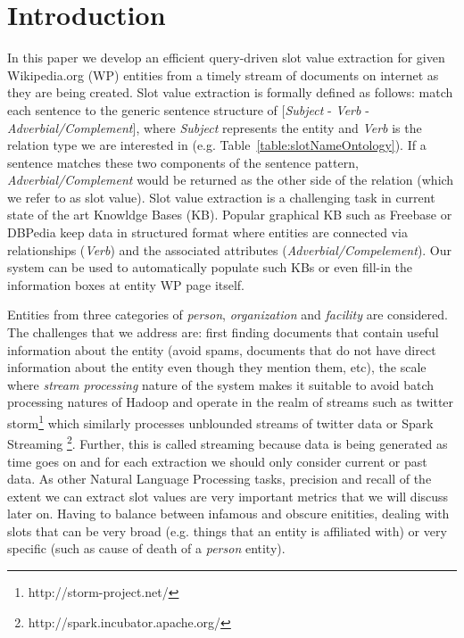 
\section{Introduction}


In this paper we develop an efficient query-driven slot value extraction for given Wikipedia.org (WP) entities from a timely stream of documents on internet as they are being created. Slot value extraction is formally defined as follows: match each sentence to the generic sentence structure of [\textit{Subject} - \textit{Verb} - \textit{Adverbial/Complement}]\cite{sentencePatterns08}, where  \textit{Subject} represents the entity and \textit{Verb} is the relation type we are interested in (e.g. Table~\ref{table:slotNameOntology}). If a sentence matches these two components of the sentence pattern, \textit{Adverbial/Complement} would be returned as the other side of the relation (which we refer to as slot value). Slot value extraction is a challenging task in current state of the art Knowldge Bases (KB). Popular graphical KB such as Freebase or DBPedia keep data in structured format where entities are connected via relationships (\textit{Verb}) and the associated attributes (\textit{Adverbial/Compelement}). Our system can be used to automatically populate such KBs or even fill-in the information boxes at entity WP page itself.

Entities from three categories of \textit{person}, \textit{organization} and \textit{facility} are considered. The challenges that we address are: first finding documents that contain useful information about the entity (avoid spams, documents that do not have direct information about the entity even though they mention them, etc), the scale where \textit{stream processing} nature of the system makes it suitable to avoid batch processing natures of Hadoop and operate in the realm of streams such as twitter storm\footnote{http://storm-project.net/} which similarly processes unblounded streams of twitter data or Spark Streaming \footnote{http://spark.incubator.apache.org/}. Further, this is called streaming because data is being generated as time goes
on and for each extraction we should only consider current or past data. As other Natural Language Processing tasks, precision and recall of the extent we can extract slot values are very important metrics that we will discuss later on. Having to balance between infamous and obscure enitities, dealing with slots that can be very broad (e.g. things that an entity is affiliated with) or very specific (such as cause of death of a \textit{person} entity).

